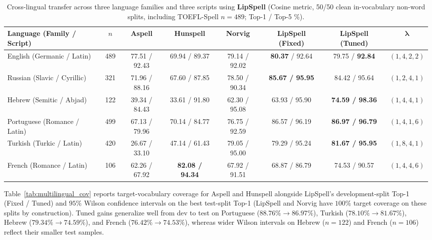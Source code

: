 \documentclass[
  journal=nlp,
  manuscript=research-article,
  year=2026,
]{cup-journal}
\begin{document}
\begin{table}[ht]
\centering
\scriptsize
\setlength{\tabcolsep}{2.2pt}
\caption{Cross-lingual transfer across three language families and three scripts using \textbf{LipSpell} (Cosine metric, 50/50 clean in-vocabulary non-word splits, including TOEFL-Spell $n=489$; Top-1 / Top-5 \%).}
\label{tab:multilingual}
\begin{tabular}{lccccccc}
\toprule
Language (Family / Script) & $n$ & Aspell & Hunspell & Norvig & LipSpell (Fixed) & LipSpell (Tuned) & $\boldsymbol{\lambda}$ \\
\midrule
English (Germanic / Latin)   & 489 & 77.51 / 92.43 & 69.94 / 89.37 & 79.14 / 92.02 & \textbf{80.37} / 92.64 & 79.75 / \textbf{92.84} & $(1,4,2,2)$ \\
Russian (Slavic / Cyrillic)  & 321 & 71.96 / 88.16 & 67.60 / 87.85 & 78.50 / 90.34 & \textbf{85.67 / 95.95} & 84.42 / 95.64 & $(1,2,4,1)$ \\
Hebrew (Semitic / Abjad)     & 122 & 39.34 / 84.43 & 33.61 / 91.80 & 62.30 / 95.08 & 63.93 / 95.90 & \textbf{74.59 / 98.36} & $(1,4,4,1)$ \\
Portuguese (Romance / Latin) & 499 & 67.13 / 79.96 & 70.14 / 84.77 & 76.75 / 92.59 & 86.57 / 96.19 & \textbf{86.97 / 96.79} & $(1,4,1,6)$ \\
Turkish (Turkic / Latin)     & 420 & 26.67 / 33.10 & 47.14 / 61.43 & 79.05 / 95.00 & 79.29 / 95.24 & \textbf{81.67 / 95.95} & $(1,8,4,1)$ \\
French (Romance / Latin)     & 106 & 62.26 / 67.92 & \textbf{82.08 / 94.34} & 67.92 / 91.51 & 68.87 / 86.79 & 74.53 / 90.57 & $(1,4,4,6)$ \\
\bottomrule
\end{tabular}
\end{table}

Table~\ref{tab:multilingual_cov} reports target-vocabulary coverage for Aspell and Hunspell alongside LipSpell's development-split Top-1 (Fixed / Tuned) and $95\%$ Wilson confidence intervals on the best test-split Top-1 (LipSpell and Norvig have $100\%$ target coverage on these splits by construction). Tuned gains generalize well from dev to test on Portuguese ($88.76\% \rightarrow 86.97\%$), Turkish ($78.10\% \rightarrow 81.67\%$), Hebrew ($79.34\% \rightarrow 74.59\%$), and French ($76.42\% \rightarrow 74.53\%$), whereas wider Wilson intervals on Hebrew ($n=122$) and French ($n=106$) reflect their smaller test samples.
\end{document}
